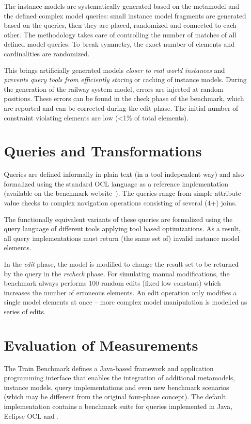 The instance models are systematically generated based on the metamodel and the
defined complex model queries: small instance model fragments are generated
based on the queries, then they are placed, randomized and connected to each
other. The methodology takes care of controlling the number of matches of all
defined model queries. To break symmetry, the exact number of elements and
cardinalities are randomized.
 
This brings artificially generated models \emph{closer to real world instances}
and \emph{prevents query tools from efficiently storing} or caching of instance
models. During the generation of the railway system model, errors are injected
at random positions. These errors can be found in the check phase of the
benchmark, which are reported and can be corrected during the edit phase. The
initial number of constraint violating elements are low (<1\% of total
elements).
 
\section{Queries and Transformations}
Queries are defined informally in plain text (in a tool independent way) and
also formalized using the standard OCL language as a reference implementation
(available on the benchmark website~\cite{TBwebsite}). The queries range from
simple attribute value checks to complex navigation operations consisting of
several (4+) joins.

The functionally equivalent variants of these queries are formalized using the
query language of different tools applying tool based optimizations. As a
result, all query implementations must return (the same set of) invalid instance
model elements.
 
In the \emph{edit} phase, the model is modified to change the result set to be
returned by the query in the \emph{recheck} phase. For simulating manual
modifications, the benchmark always performs 100 random edits (fixed low
constant) which increases the number of erroneous elements. An edit operation
only modifies a single model elements at once -- more complex model manipulation is
modelled as series of edits.

\section{Evaluation of Measurements}
The Train Benchmark defines a Java-based framework and application programming
interface that enables the integration of additional metamodels, instance
models, query implementations and even new benchmark scenarios (which may be
different from the original four-phase concept). The default implementation
contains a benchmark suite for queries implemented in Java, Eclipse OCL and
\eiq{}.

